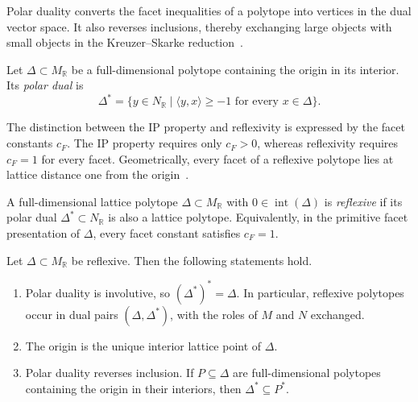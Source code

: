 \documentclass[appliedmath,article,submit,moreauthors]{Definitions/mdpi}
\newcommand{\RR}{\mathbb{R}}
\newcommand{\interior}{\operatorname{int}}
\begin{document}
Polar duality converts the facet inequalities of a polytope into vertices in the
dual vector space. It also reverses inclusions, thereby exchanging large objects
with small objects in the Kreuzer--Skarke reduction~\cite{Batyrev1994,KS97}.

\begin{Definition}
\label{def:polar-dual}
Let \(\Delta\subset M_{\RR}\) be a full-dimensional polytope containing the
origin in its interior. Its \emph{polar dual} is
\[
\Delta^*=\{y\in N_{\RR}\mid \langle y,x\rangle\geq-1
\text{ for every }x\in\Delta\}.
\]
\end{Definition}

The distinction between the IP property and reflexivity is expressed by the
facet constants \(c_F\). The IP property requires only \(c_F>0\), whereas
reflexivity requires \(c_F=1\) for every facet. Geometrically, every facet of a
reflexive polytope lies at lattice distance one from the
origin~\cite{Batyrev1994,KS97}.

\begin{Definition}
\label{def:reflexive}
A full-dimensional lattice polytope \(\Delta\subset M_{\RR}\) with
\(0\in\interior(\Delta)\) is \emph{reflexive} if its polar dual
\(\Delta^*\subset N_{\RR}\) is also a lattice polytope. Equivalently, in the
primitive facet presentation of \(\Delta\), every facet constant satisfies
\(c_F=1\).
\end{Definition}

\begin{Proposition}
\label{prop:reflexive-properties}
Let \(\Delta\subset M_{\RR}\) be reflexive. Then the following statements hold.
\begin{enumerate}
    \item Polar duality is involutive, so \((\Delta^*)^*=\Delta\). In
    particular, reflexive polytopes occur in dual pairs \((\Delta,\Delta^*)\),
    with the roles of \(M\) and \(N\) exchanged.
    \item The origin is the unique interior lattice point of \(\Delta\).
    \item Polar duality reverses inclusion. If \(P\subseteq\Delta\) are
    full-dimensional polytopes containing the origin in their interiors, then
    \(\Delta^*\subseteq P^*\).
\end{enumerate}
\end{Proposition}
\end{document}
